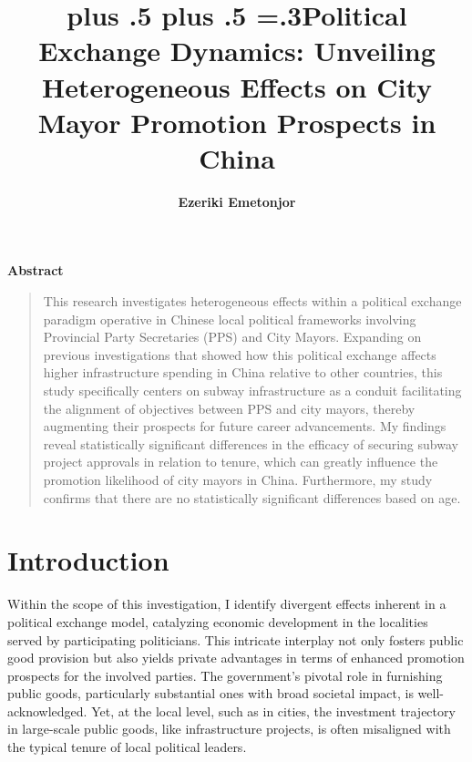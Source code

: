\documentclass[12pt, ]{article}
\title{\sffamily\bfseries\huge\parfillskip=0pt
\rightskip=0pt plus .5\textwidth
\leftskip=0pt plus .5\textwidth
\emergencystretch=.3\textwidth Political Exchange Dynamics: Unveiling
Heterogeneous Effects on City Mayor Promotion Prospects in China}
\author{\textbf{Ezeriki Emetonjor}
 }
\date{}
\renewenvironment{abstract}{
  \centerline
  {\large\sffamily\bfseries Abstract}\vspace{-1em}
  \begin{quote}\small
}{
  \end{quote}
}
\begin{document}
\allsectionsfont{\sffamily}

\maketitle

\begin{abstract}
This research investigates heterogeneous effects within a political
exchange paradigm operative in Chinese local political frameworks
involving Provincial Party Secretaries (PPS) and City Mayors. Expanding
on previous investigations that showed how this political exchange
affects higher infrastructure spending in China relative to other
countries, this study specifically centers on subway infrastructure as a
conduit facilitating the alignment of objectives between PPS and city
mayors, thereby augmenting their prospects for future career
advancements. My findings reveal statistically significant differences
in the efficacy of securing subway project approvals in relation to
tenure, which can greatly influence the promotion likelihood of city
mayors in China. Furthermore, my study confirms that there are no
statistically significant differences based on age.
\end{abstract}

\ifdefined\Shaded\renewenvironment{Shaded}{\begin{tcolorbox}[sharp corners, boxrule=0pt, breakable, interior hidden, enhanced, borderline west={3pt}{0pt}{shadecolor}, frame hidden]}{\end{tcolorbox}}\fi




\newpage{}

\hypertarget{introduction}{%
\section{Introduction}\label{introduction}}

Within the scope of this investigation, I identify divergent effects
inherent in a political exchange model, catalyzing economic development
in the localities served by participating politicians. This intricate
interplay not only fosters public good provision but also yields private
advantages in terms of enhanced promotion prospects for the involved
parties. The government's pivotal role in furnishing public goods,
particularly substantial ones with broad societal impact, is
well-acknowledged. Yet, at the local level, such as in cities, the
investment trajectory in large-scale public goods, like infrastructure
projects, is often misaligned with the typical tenure of local political
leaders.
\end{document}

